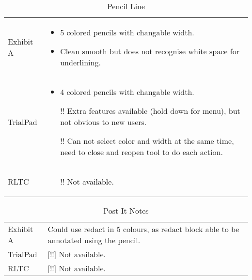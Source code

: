 \begin{center}
\begin{center}
\begin{table}[h!]
\begin{tabular}{|p{}|p{}|}
\end{tabular}\\
\end{table}
\end{center}

\begin{center}
\begin{table}[h!]

\label{Table 7:}    
\caption{Pencil Line}
\centering
\begin{tabular}{|p{}|p{}|}
\hline
\rowcolor{lightgrey}\multicolumn{2}{|c|}{Pencil Line}\\
\hline
Exhibit A &
 \begin{itemize}
	\item 5 colored pencils with changable width.
	\item Clean smooth but does not recognise white space for underlining.
 \end{itemize}\\
\hline
TrialPad & 
 \begin{itemize}
	\item 4 colored pencils with changable width.
	\item [\color{amber}!!]\color{black}Extra features available (hold down for menu), but not obvious to new users.
	\item [\color{amber}!!]\color{black}Can not select color and width at the same time, need to close and reopen tool to do each action.
 \end{itemize}\\
\hline
RLTC & 
\begin{itemize}
  \item [\color{amber}!!]\color{black} Not available.
\end{itemize}\\
\hline

\end{tabular}
\end{table}
\end{center}

\begin{center}
\begin{table}[h!]

\label{Table 8:}    
\caption{Post It Notes}
\centering
\begin{tabular}{|p{}|p{}|}
\hline
\rowcolor{lightgrey}\multicolumn{2}{|c|}{Post It Notes}\\
\hline
Exhibit A & Could use redact in 5 colours, as redact block able to be annotated using the pencil.\\
\hline
TrialPad & [\color{amber}!!]\color{black} Not available.\\
\hline
RLTC & [\color{amber}!!]\color{black} Not available.
\hline
\end{tabular}
\end{table}
\end{center}


\end{center}
